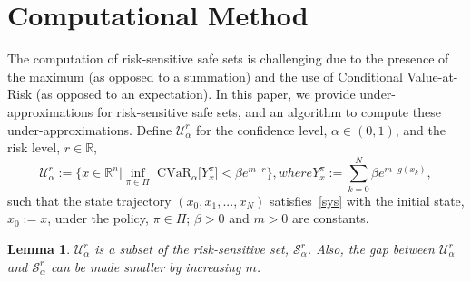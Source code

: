 \documentclass[letterpaper, 10 pt, conference]{ieeeconf}  %
\newtheorem{lemma}{Lemma}
\begin{document}
\section{Computational Method}\label{alg}
The computation of risk-sensitive safe sets is challenging due to the presence of the maximum (as opposed to a summation)
and the use of Conditional Value-at-Risk (as opposed to an expectation). In this paper, we provide under-approximations 
for risk-sensitive safe sets, and an algorithm to compute these under-approximations. Define $\mathcal{U}_\alpha^r$
for the confidence level, $\alpha \in (0,1)$, and the risk level, $r \in \mathbb{R}$,
\begin{subequations}\label{under}\begin{equation}
\mathcal{U}_\alpha^r := 
\Big\{x \in \mathbb{R}^n \Big| {\underset{\pi \in \Pi}\inf} \text{ CVaR}_\alpha \big[ Y_x^\pi \big] < \beta e^{m\cdot r} \Big\},
\end{equation}
where
\begin{equation}
Y_x^\pi := \overset{N}{\underset{k=0}\sum} \beta e^{m\cdot g(x_k)},
\end{equation}
\end{subequations}
such that the state trajectory $(x_0, x_1, ..., x_N)$
satisfies~\eqref{sys} with the initial state, $x_0 := x$, under the policy, $\pi \in \Pi$;
$\beta > 0$ and $m > 0$ are constants.
\begin{lemma}\label{lemma2}
$\mathcal{U}_\alpha^r$ is a subset of the risk-sensitive set, $\mathcal{S}_\alpha^r$. 
Also, the gap between $\mathcal{U}_\alpha^r$ and $\mathcal{S}_\alpha^r$ can be made smaller by increasing $m$.
\end{lemma}
\end{document}
